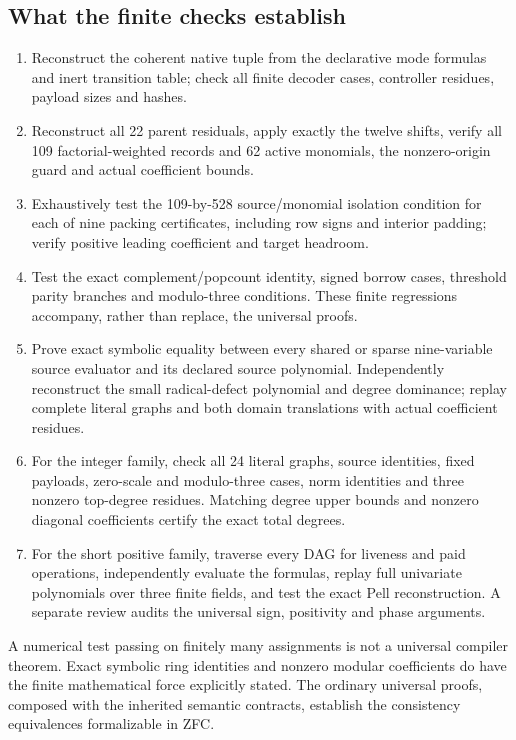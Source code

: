 \subsection{What the finite checks establish}
\begin{enumerate}
\item Reconstruct the coherent native tuple from the declarative mode
formulas and inert transition table; check all finite decoder cases,
controller residues, payload sizes and hashes.
\item Reconstruct all 22 parent residuals, apply exactly the twelve shifts,
verify all 109 factorial-weighted records and 62 active monomials, the
nonzero-origin guard and actual coefficient bounds.
\item Exhaustively test the 109-by-528 source/monomial isolation condition
for each of nine packing certificates, including row signs and interior
padding; verify positive leading coefficient and target headroom.
\item Test the exact complement/popcount identity, signed borrow cases,
threshold parity branches and modulo-three conditions. These finite
regressions accompany, rather than replace, the universal proofs.
\item Prove exact symbolic equality between every shared or sparse
nine-variable source evaluator and its declared source polynomial.
Independently reconstruct the small radical-defect polynomial and degree
dominance; replay complete literal graphs and both domain translations
with actual coefficient residues.
\item For the integer family, check all 24 literal graphs, source identities,
fixed payloads, zero-scale and modulo-three cases, norm identities and
three nonzero top-degree residues. Matching degree upper bounds and
nonzero diagonal coefficients certify the exact total degrees.
\item For the short positive family, traverse every DAG for liveness and
paid operations, independently evaluate the formulas, replay full univariate
polynomials over three finite fields, and test the exact Pell reconstruction.
A separate review audits the universal sign, positivity and phase arguments.
\end{enumerate}
A numerical test passing on finitely many assignments is not a universal
compiler theorem. Exact symbolic ring identities and nonzero modular
coefficients do have the finite mathematical force explicitly stated.
The ordinary universal proofs, composed with the inherited semantic
contracts, establish the consistency equivalences formalizable in ZFC.

